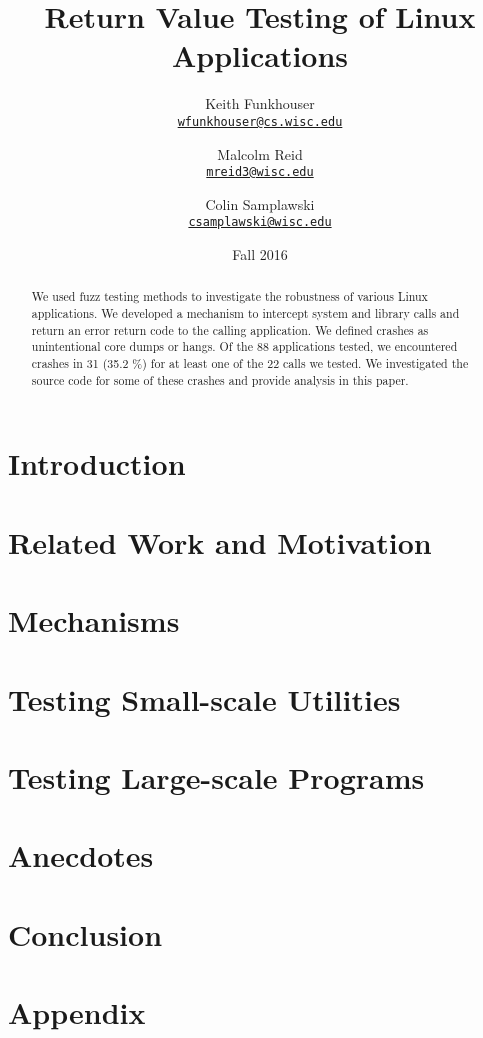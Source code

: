 \documentclass[10pt]{article}
\title{Return Value Testing of Linux Applications}
\author{Keith Funkhouser \\ \texttt{\href{mailto:wfunkhouser@cs.wisc.edu}{wfunkhouser@cs.wisc.edu}}
\and Malcolm Reid\\ \texttt{\href{mailto:mreid3@wisc.edu}{mreid3@wisc.edu}}
\and Colin Samplawski\\ \texttt{\href{mailto:csamplawski@wisc.edu}{csamplawski@wisc.edu}}
}
\date{Fall 2016}
\begin{document}
\setlength{\baselineskip}{18pt}
\maketitle

\begin{abstract}
\setlength{\baselineskip}{18pt}
We used fuzz testing methods to investigate the robustness of various Linux applications. We developed a mechanism to intercept system and library calls and return an error return code to the calling application. We defined crashes as unintentional core dumps or hangs. Of the 88 applications tested, we encountered crashes in 31 (35.2 \%) for at least one of the 22 calls we tested. We investigated the source code for some of these crashes and provide analysis in this paper. 
\end{abstract}

\section{Introduction}


\section{Related Work and Motivation}



\section{Mechanisms}



\section{Testing Small-scale Utilities}





\section{Testing Large-scale Programs}


\section{Anecdotes}


\section{Conclusion}




\newpage
\appendix
\section*{Appendix}
\lstset{numbers=left}




\end{document}
